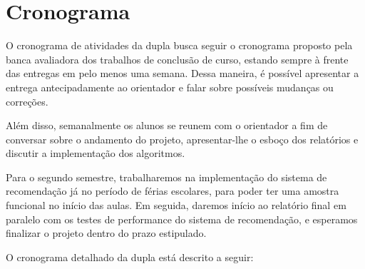\chapter[Cronograma]{Cronograma}
\label{chap:cronograma}

O cronograma de atividades da dupla busca seguir o cronograma proposto pela banca avaliadora dos trabalhos de conclusão de curso, estando sempre à frente das entregas em pelo menos uma semana. Dessa maneira, é possível apresentar a entrega antecipadamente ao orientador e falar sobre possíveis mudanças ou correções.

Além disso, semanalmente os alunos se reunem com o orientador a fim de conversar sobre o andamento do projeto, apresentar-lhe o esboço dos relatórios e discutir a implementação dos algoritmos. 

Para o segundo semestre, trabalharemos na implementação do sistema de recomendação já no período de férias escolares, para poder ter uma amostra funcional no início das aulas. Em seguida, daremos início ao relatório final em paralelo com os testes de performance do sistema de recomendação, e esperamos finalizar o projeto dentro do prazo estipulado.

O cronograma detalhado da dupla está descrito a seguir:

